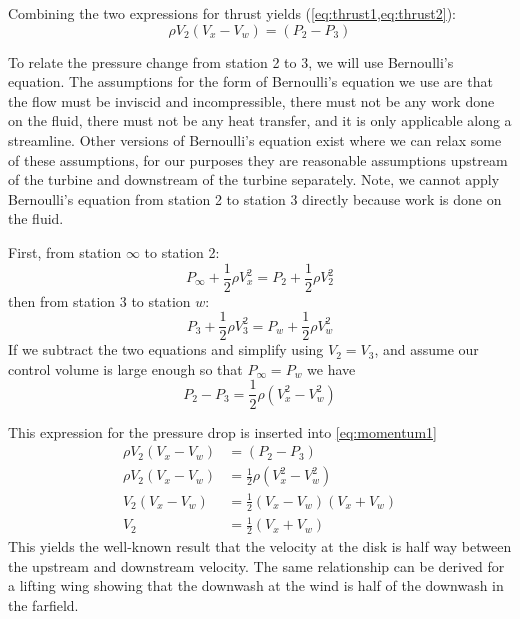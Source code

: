 Combining the two expressions for thrust yields (\cref{eq:thrust1,eq:thrust2}):
\begin{equation}
    \rho V_2 (V_x - V_w) = (P_2 - P_3)
    \label{eq:momentum1}
\end{equation}

To relate the pressure change from station 2 to 3, we will use Bernoulli's equation.  The assumptions for the form of Bernoulli's equation we use are that the flow must be inviscid and incompressible, there must not be any work done on the fluid, there must not be any heat transfer, and it is only applicable along a streamline.  Other versions of Bernoulli's equation exist where we can relax some of these assumptions, for our purposes they are reasonable assumptions upstream of the turbine and downstream of the turbine separately.  Note, we cannot apply Bernoulli's equation from station 2 to station 3 directly because work is done on the fluid.

First, from station $\infty$ to station 2:
\begin{equation}
    P_\infty + \frac{1}{2}\rho V_x^2 = P_2 + \frac{1}{2}\rho V_2^2
\end{equation}
then from station 3 to station $w$:
\begin{equation}
    P_3 + \frac{1}{2}\rho V_3^2 = P_w + \frac{1}{2}\rho V_w^2
\end{equation}
If we subtract the two equations and simplify using $V_2 = V_3$, and assume our control volume is large enough so that $P_\infty = P_w$ we have
\begin{equation}
    P_2 - P_3 = \frac{1}{2}\rho (V_x^2 - V_w^2)
\end{equation}

This expression for the pressure drop is inserted into \cref{eq:momentum1}
\begin{equation}
\begin{aligned}
    \rho V_2 (V_x - V_w) &= (P_2 - P_3)\\
    \rho V_2 (V_x - V_w) &= \frac{1}{2}\rho (V_x^2 - V_w^2)\\
    V_2 (V_x - V_w) &= \frac{1}{2} (V_x - V_w)(V_x + V_w)\\
    V_2 &= \frac{1}{2} (V_x + V_w)
\end{aligned}
\end{equation}
This yields the well-known result that the velocity at the disk is half way between the upstream and downstream velocity.  The same relationship can be derived for a lifting wing showing that the downwash at the wind is half of the downwash in the farfield.

